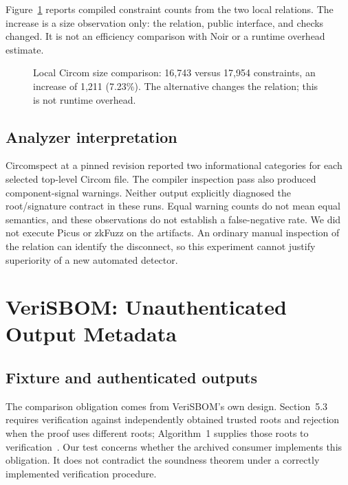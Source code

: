 \documentclass[sigconf,nonacm]{acmart}
\begin{document}
Figure~\ref{fig:size} reports compiled constraint counts from the two local relations. The increase is a size observation only: the relation, public interface, and checks changed. It is not an efficiency comparison with Noir or a runtime overhead estimate.

\begin{figure}[t]
\centering
{}
\caption{Local Circom size comparison: 16,743 versus 17,954 constraints, an increase of 1,211 (7.23\%). The alternative changes the relation; this is not runtime overhead.}
\label{fig:size}
\end{figure}

\subsection{Analyzer interpretation}
Circomspect at a pinned revision reported two informational categories for each selected top-level Circom file. The compiler inspection pass also produced component-signal warnings. Neither output explicitly diagnosed the root/signature contract in these runs. Equal warning counts do not mean equal semantics, and these observations do not establish a false-negative rate. We did not execute Picus or zkFuzz on the artifacts. An ordinary manual inspection of the relation can identify the disconnect, so this experiment cannot justify superiority of a new automated detector.

\section{VeriSBOM: Unauthenticated Output Metadata}
\subsection{Fixture and authenticated outputs}
The comparison obligation comes from VeriSBOM's own design. Section~5.3 requires verification against independently obtained trusted roots and rejection when the proof uses different roots; Algorithm~1 supplies those roots to verification~\cite{verisbom}. Our test concerns whether the archived consumer implements this obligation. It does not contradict the soundness theorem under a correctly implemented verification procedure.
\end{document}
